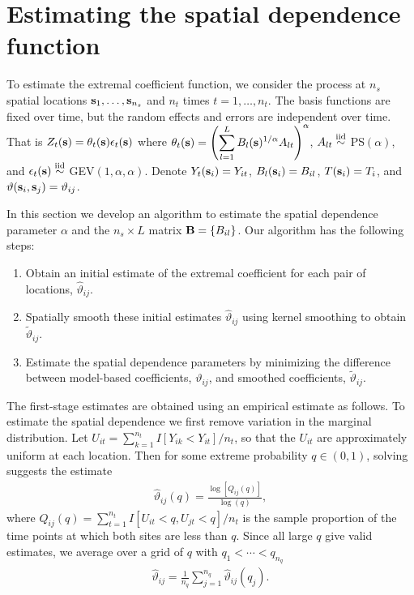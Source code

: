 \section{Estimating the spatial dependence function}\label{ebs:estimation}

To estimate the extremal coefficient function, we consider the process at $n_s$ spatial locations $\mathbf{s}_1,\ldots,\mathbf{s}_{n_s}$ and $n_t$ times $t=1,\ldots,n_t$.
The basis functions are fixed over time, but the random effects and errors are independent over time.
That is $Z_t(\mathbf{s}) = \theta_t(\mathbf{s}) \epsilon_t(\mathbf{s})$ where $\theta_t(\mathbf{s}) = \left(\displaystyle \sum_{l=1}^L B_{l}(\mathbf{s})^{1/\alpha}A_{lt}\right)^{\alpha}$, $A_{lt} \stackrel{\mathrm{iid}}{\sim}$ PS$(\alpha)$, and $\epsilon_t(\mathbf{s}) \stackrel{\mathrm{iid}}{\sim}$ GEV$(1, \alpha, \alpha)$.
Denote $Y_t(\mathbf{s}_i) = Y_{it}$, $B_l(\mathbf{s}_i) = B_{il}$, $T(\mathbf{s}_i)=T_i$, and $\vartheta(\mathbf{s}_i,\mathbf{s}_j) = \vartheta_{ij}$.

In this section we develop an algorithm to estimate the spatial dependence parameter $\alpha$ and the $n_s\times L$ matrix $\mathbf{B} = \{B_{il}\}$.
Our algorithm has the following steps:
\begin{enumerate}[(1)]
  \item Obtain an initial estimate of the extremal coefficient for each pair of locations, ${\hat \vartheta}_{ij}$.
  \item Spatially smooth these initial estimates ${\hat \vartheta}_{ij}$ using kernel smoothing to obtain ${\tilde \vartheta}_{ij}$.
  \item Estimate the spatial dependence parameters by minimizing the difference between model-based coefficients, $\vartheta_{ij}$, and smoothed coefficients, ${\tilde \vartheta}_{ij}$.
\end{enumerate}

The first-stage estimates are obtained using an empirical estimate as follows.
To estimate the spatial dependence we first remove variation in the marginal distribution.
Let $U_{it} = \sum_{k=1}^{n_t} I[Y_{ik}<Y_{it}]/n_t$, so that the $U_{it}$ are approximately uniform at each location.
Then for some extreme probability $q\in(0,1)$, solving  suggests the estimate
\begin{align}\label{ebeq:EChat0}
   {\hat \vartheta}_{ij}(q) = \frac{\log[Q_{ij}(q)]}{\log(q)},
\end{align}
where $Q_{ij}(q) = \sum_{t=1}^{n_t}I[U_{it}<q,U_{jt}<q]/n_t$ is the sample proportion of the time points at which both sites are less than $q$.
Since all large $q$ give valid estimates, we average over a grid of $q$ with $q_1< \cdots <q_{n_q}$
\begin{align} \label{ebeq:EChat1}
{\hat \vartheta}_{ij} = \frac{1}{n_q}\sum_{j=1}^{n_q}{\hat \vartheta}_{ij}(q_j).
\end{align}

